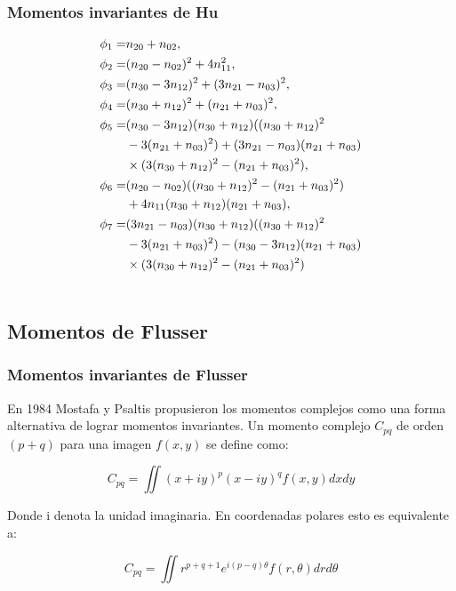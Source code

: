 \documentclass{beamer}
\begin{document}
	\begin{frame}
	\frametitle{Momentos invariantes de Hu}
	\begin{align}
		\phi_1 =& n_{20} + n_{02}, \notag\\ 
		\phi_2 =& (n_{20} - n_{02})^{2} + 4n_{11}^{2}, \notag \\ 
		\phi_3 =& (n_{30} - 3n_{12})^{2} + (3n_{21} - n_{03})^{2}, \notag \\ 
		\phi_4 =& (n_{30} + n_{12})^{2} + (n_{21} + n_{03})^{2},\notag \\ 
		\phi_5 =& (n_{30} - 3n_{12})(n_{30} + n_{12})((n_{30} + n_{12})^{2} \notag \\
				& - 3(n_{21} + n_{03})^{2}) + (3n_{21} - n_{03})(n_{21} + n_{03})\notag\\ 
				& \times (3(n_{30} + n_{12})^{2} - (n_{21} + n_{03})^{2}),\notag\\ 
		\phi_6 =& (n_{20} - n_{02})((n_{30} + n_{12})^{2} - (n_{21} + n_{03})^{2})\notag\\
				& + 4n_{11}(n_{30} + n_{12})(n_{21} + n_{03}),\notag\\
		\phi_7 =& (3n_{21} - n_{03})(n_{30} + n_{12})((n_{30} + n_{12})^{2}\notag\\
				& - 3(n_{21} + n_{03})^{2}) - (n_{30} - 3n_{12})(n_{21} + n_{03}) \notag\\
				& \times (3(n_{30} + n_{12})^{2} - (n_{21} + n_{03})^{2}) \label{eq:huMom} \\ \notag
	\end{align}
	\end{frame}
	
	\subsection{Momentos de Flusser}
	\begin{frame}
	\frametitle{Momentos invariantes de Flusser}
	En 1984 Mostafa y Psaltis propusieron los momentos complejos como una forma alternativa de lograr momentos invariantes. Un momento complejo $C_{pq}$ de orden $(p+q)$ para una imagen $f(x,y)$ se define como:

	\[ C_{pq} = \iint{ (x+iy)^p (x-iy)^q f(x,y) dx dy } \]
	
Donde i denota la unidad imaginaria. En coordenadas polares esto es equivalente a:

	\begin{equation}\label{eq:polarCplx}
		C_{pq} = \iint{ r^{p+q+1}e^{i(p-q)\theta}f(r,\theta) dr d\theta }
	\end{equation}
	\end{frame}
	
\end{document}
